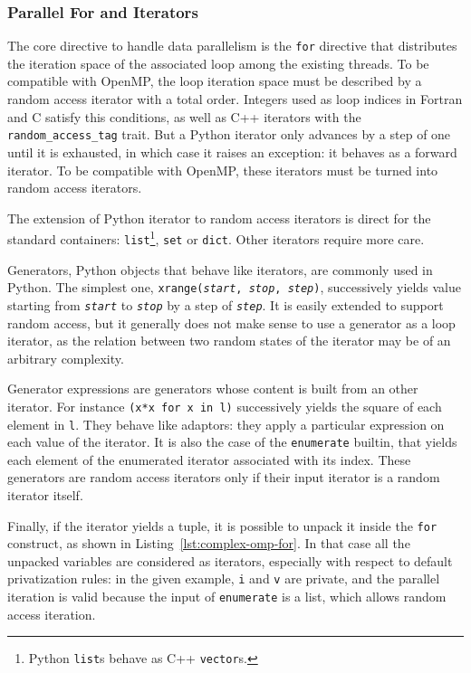 \documentclass{sigplanconf}
\begin{document}
\subsubsection{Parallel For and Iterators}

The core directive to handle data parallelism is the \texttt{for} directive that
distributes the iteration space of the associated loop among the existing
threads. To be compatible with OpenMP, the loop iteration space must be
described by a random access iterator with a total order. Integers used as loop
indices in Fortran and C satisfy this conditions, as well as C++ iterators with
the \texttt{random\_access\_tag} trait. But a Python iterator only advances by a
step of one until it is exhausted, in which case it raises an exception: it
behaves as a forward iterator. To be compatible with OpenMP, these iterators
must be turned into random access iterators.

The extension of Python iterator to random access iterators is direct for the
standard containers: \texttt{list}\footnote{Python \texttt{list}s behave as C++
\texttt{vector}s.}, \texttt{set} or \texttt{dict}. Other iterators require more
care.

Generators, Python objects that behave like iterators, are commonly used in
Python. The simplest one, \texttt{xrange(\emph{start}, \emph{stop},
\emph{step})}, successively yields value starting from \texttt{\emph{start}} to
\texttt{\emph{stop}} by a step of \texttt{\emph{step}}. It is easily extended to
support random access, but it generally does not make sense to use a generator
as a loop iterator, as the relation between two random states of the iterator
may be of an arbitrary complexity.

Generator expressions are generators whose content is built from an other
iterator. For instance \texttt{(x*x for x in l)} successively yields the square
of each element in \texttt{l}. They behave like adaptors: they apply a
particular expression on each value of the iterator. It is also the case of the
\texttt{enumerate} builtin, that yields each element of the enumerated iterator
associated with its index. These generators are random access iterators only if their
input iterator is a random iterator itself.

Finally, if the iterator yields a tuple, it is possible to unpack it inside the
\texttt{for} construct, as shown in Listing~\ref{lst:complex-omp-for}. In that case
all the unpacked variables are considered as iterators, especially with respect
to default privatization rules: in the given example, \texttt{i} and \texttt{v}
are private, and the parallel iteration is valid because the input of
\texttt{enumerate} is a list, which allows random access iteration.
\end{document}
